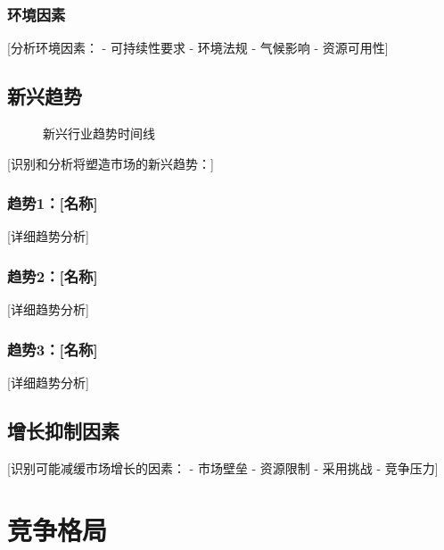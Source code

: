 \documentclass[11pt,letterpaper]{report}
\begin{document}
{\subsection{环境因素}
[分析环境因素：
- 可持续性要求
- 环境法规
- 气候影响
- 资源可用性]

\section{新兴趋势}


\begin{figure}[htbp]
\centering
\caption{新兴行业趋势时间线}
\label{fig:trends}
\end{figure}

[识别和分析将塑造市场的新兴趋势：]

\subsection{趋势1：[名称]}
[详细趋势分析]

\subsection{趋势2：[名称]}
[详细趋势分析]

\subsection{趋势3：[名称]}
[详细趋势分析]

\section{增长抑制因素}

[识别可能减缓市场增长的因素：
- 市场壁垒
- 资源限制
- 采用挑战
- 竞争压力]

\chapter{竞争格局}

}
\end{document}
